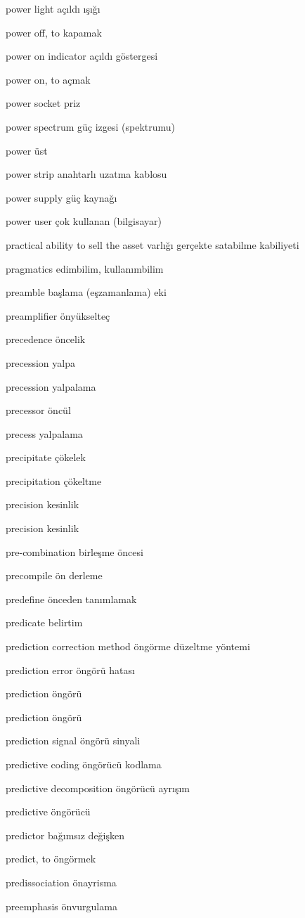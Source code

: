 \documentclass[12pt,fleqn]{article}\usepackage{../../common}
\begin{document}
power light açıldı ışığı

power off, to kapamak

power on indicator açıldı göstergesi

power on, to açmak

power socket priz

power spectrum güç izgesi (spektrumu)

power üst

power strip anahtarlı uzatma kablosu

power supply güç kaynağı

power user çok kullanan (bilgisayar)

practical ability to sell the asset varlığı gerçekte satabilme kabiliyeti

pragmatics edimbilim, kullanımbilim

preamble başlama (eşzamanlama) eki

preamplifier önyükselteç

precedence öncelik

precession yalpa

precession yalpalama

precessor öncül

precess yalpalama

precipitate çökelek

precipitation çökeltme

precision kesinlik

precision kesinlik

pre-combination birleşme öncesi

precompile ön derleme

predefine önceden tanımlamak

predicate belirtim

prediction correction method öngörme düzeltme yöntemi

prediction error öngörü hatası

prediction öngörü

prediction öngörü

prediction signal öngörü sinyali

predictive coding öngörücü kodlama

predictive decomposition öngörücü ayrışım

predictive öngörücü

predictor bağımsız değişken

predict, to öngörmek

predissociation önayrisma

preemphasis önvurgulama
\end{document}
